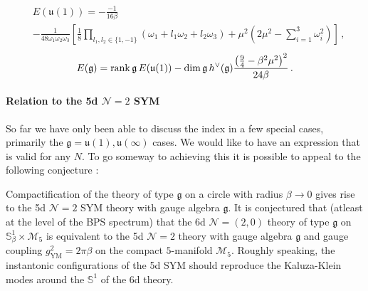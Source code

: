 \documentclass[main.tex]{subfiles}
\begin{document}
\begin{equation}
\begin{aligned}
&E(\mathfrak{u}(1))=-\frac{-1}{16\beta}\\
&-\frac{1}{48\omega_1\omega_2\omega_3}\left[
   \frac{1}{8}\prod_{l_1,l_2\in\{1,-1\}}\left(\omega_1+l_1\omega_2+l_2\omega_3\right) +\mu^2(2\mu^2- 
  \sum_{i=1}^3\omega_i^2)\right]\,,\end{aligned}
  \end{equation}
\begin{equation}
E(\mathfrak{g})=\operatorname{rank}{\mathfrak{g}}\,E(\mathfrak{u}(1))-\dim{\mathfrak{g}}\,h^{\vee}(\mathfrak{g})\frac{\left(\frac{9}{4}-\beta^2\mu^2\right)^2}{24\beta}\,.
\end{equation}
\paragraph{Relation to the 5d $\mathcal{N}=2$ SYM}
So far we have only been able to discuss the index in a few special cases, primarily the $\mathfrak{g}=\mathfrak{u}(1),\mathfrak{u}(\infty)$ cases.  We would like to have an expression that is valid for any $N$.  To go someway to achieving this it is possible to appeal to the following conjecture \cite{Aharony:1997an,Douglas:2010iu,Kim:2013nva,Lambert:2010wm,Lambert:2010iw,Kim:2012ava,Kim:2011mv,Aharony:1997th}:

Compactification of the theory of type $\mathfrak{g}$ on a circle with radius $\beta\to0$ gives rise to the 5d $\mathcal{N}=2$ SYM theory with gauge algebra $\mathfrak{g}$. It is conjectured that (atleast at the level of the BPS spectrum) that the 6d $\mathcal{N}=(2,0)$ theory of type $\mathfrak{g}$ on $\mathbb{S}^1_{\beta}\times \mathcal{M}_5$ is equivalent to the 5d $\mathcal{N}=2$ theory with gauge algebra $\mathfrak{g}$ and gauge coupling $g^2_{\text{YM}}=2\pi\beta$ on the compact $5$-manifold $\mathcal{M}_5$.  Roughly speaking, the instantonic configurations of the 5d SYM should reproduce the Kaluza-Klein modes around the $\mathbb{S}^1$ of the 6d theory.
\end{document}
